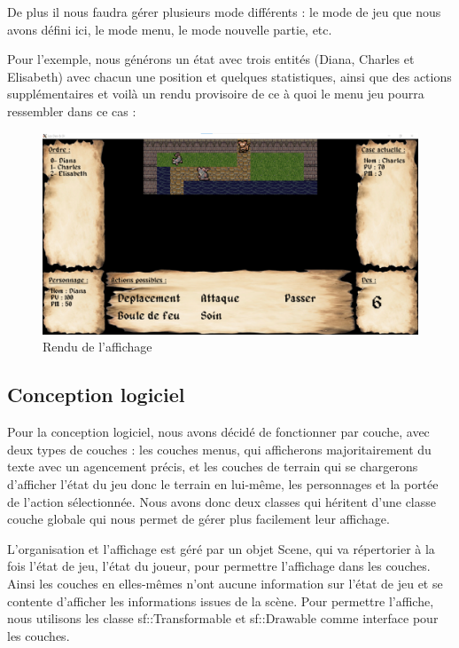 \documentclass[a4paper,12pt]{article}
\begin{document}
De plus il nous faudra gérer plusieurs mode différents : le mode de jeu que nous avons défini ici, le mode menu, le mode nouvelle partie, etc.

Pour l'exemple, nous générons un état avec trois entités (Diana, Charles et Elisabeth) avec chacun une position et quelques statistiques, ainsi que des actions supplémentaires et voilà un rendu provisoire de ce à quoi le menu jeu pourra ressembler dans ce cas :
\begin{figure}[hbt!]
    \centering
    \includegraphics[width =.8\paperwidth, angle=0]{images/rendu.png}
    \caption{Rendu de l'affichage}
    \label{fig:rendu}
\end{figure}
\newpage

\subsection{Conception logiciel}

Pour la conception logiciel, nous avons décidé de fonctionner par couche, avec deux types de couches : les couches menus, qui afficherons majoritairement du texte avec un agencement précis, et les couches de terrain qui se chargerons d'afficher l'état du jeu donc le terrain en lui-même, les personnages et la portée de l'action sélectionnée. Nous avons donc deux classes qui héritent d'une classe couche globale qui nous permet de gérer plus facilement leur affichage.

L'organisation et l'affichage est géré par un objet Scene, qui va répertorier à la fois l'état de jeu, l'état du joueur, pour permettre l'affichage dans les couches. Ainsi les couches en elles-mêmes n'ont aucune information sur l'état de jeu et se contente d'afficher les informations issues de la scène. Pour permettre l'affiche, nous utilisons les classe sf::Transformable et sf::Drawable comme interface pour les couches.
\end{document}
